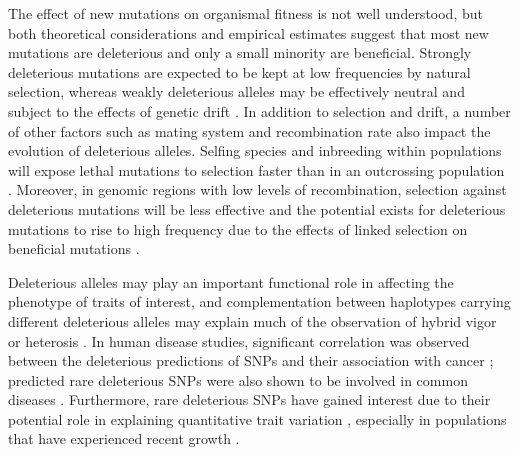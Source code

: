 \documentclass[12pt]{article}
\begin{document}
The effect of new mutations on organismal fitness is not well understood, but both theoretical considerations \citep{Fisher1930} and empirical estimates \citep{Joseph2004} suggest that most new mutations are deleterious and only a small minority are beneficial. Strongly deleterious mutations are expected to be kept at low frequencies by natural selection, whereas weakly deleterious alleles may be effectively neutral \citep{Ohta1973, Kimura1983} and subject to the effects of genetic drift \citep{Lynch1990,Lande1994,Whitlock2003}. In addition to selection and drift, a number of other factors such as mating system and recombination rate also impact the evolution of deleterious alleles. Selfing species and inbreeding within populations will expose lethal mutations to selection faster than in an outcrossing population \citep{Wang1999,Glemin2003}. Moreover, in genomic regions with low levels of recombination, selection against deleterious mutations will be less effective \citep{Charlesworth1993fp} and the potential exists for deleterious mutations to rise to high frequency due to the effects of linked selection on beneficial mutations \citep{Felsenstein1974, Hill1966, Chun2011}. 
 
Deleterious alleles may play an important functional role in affecting the phenotype of traits of interest, and complementation between haplotypes carrying different deleterious alleles may explain much of the observation of hybrid vigor or heterosis \citep{Charlesworth2009}. 
In human disease studies, significant correlation was observed between the deleterious predictions of SNPs and their association with cancer \citep{Zhu2004}; predicted rare deleterious SNPs were also shown to be involved in common diseases \citep{Cohen2004,Smigrodzki2004}.
Furthermore, rare deleterious SNPs have gained interest due to their potential role in explaining quantitative trait variation \citep{Gibson2012}, especially in populations that have experienced recent growth \citep{LohmuellerArXiv} .
\end{document}

